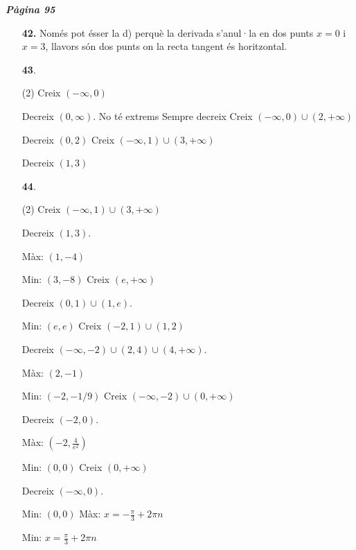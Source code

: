 \documentclass[a4paper, pdf, twoside]{book}
\begin{document}
{\textbf{\em Pàgina 95}} \hrulefill
\begin{enumerate}
\vspace{0.25cm}
\item[\fontfamily{phv}\selectfont\color{blue}\textbf{42. }] 
Només pot ésser la d) perquè la derivada s'anul·la en dos punts $x=0$ i $x=3$, llavors són dos punts on la recta tangent és horitzontal.
 \end{enumerate}
\begin{enumerate}
\vspace{0.25cm}



 \item[\fontfamily{phv}\selectfont\color{blue}\textbf{43}. ] 
 \begin{tasks}[column-sep=1em, item-indent=1.3333em](2)
	 \task  Creix $(-\infty ,0)$\par Decreix $(0,\infty )$. No té extrems
	 \task Sempre decreix
	 \task Creix $(-\infty ,0)\cup (2,+\infty )$\par Decreix $(0,2)$
	 \task Creix $(-\infty ,1)\cup (3,+\infty )$\par Decreix $(1,3)$
\end{tasks}
\vspace{0.25cm}



 \item[\fontfamily{phv}\selectfont\color{blue}\textbf{44}. ] 
 \begin{tasks}[column-sep=1em, item-indent=1.3333em](2)
	 \task Creix $(-\infty ,1)\cup (3,+\infty )$\par Decreix $(1,3)$.\par Màx: $(1,-4)$ \par Min: $(3,-8)$
	 \task Creix $(e,+\infty )$\par Decreix $(0,1)\cup (1,e)$.\par Min: $(e,e)$
	 \task Creix $(-2,1)\cup (1,2)$\par Decreix $(-\infty ,-2)\cup (2,4)\cup (4,+\infty )$.\par Màx: $(2,-1)$ \par Min: $(-2,-1/9)$
	 \task Creix $(-\infty ,-2)\cup (0,+\infty )$\par Decreix $(-2,0)$.\par Màx: $(-2,\frac {4}{e^2})$\par Min: $(0,0)$
	 \task Creix $(0,+\infty )$\par Decreix $(-\infty ,0)$.\par Min: $(0,0)$
	 \task Màx: $x=-\frac {\pi }{3}+2\pi n$ \par Min: $x=\frac {\pi }{3}+2\pi n$ 
\end{tasks}
 \end{enumerate}
\vspace{0.3cm}
\end{document}
